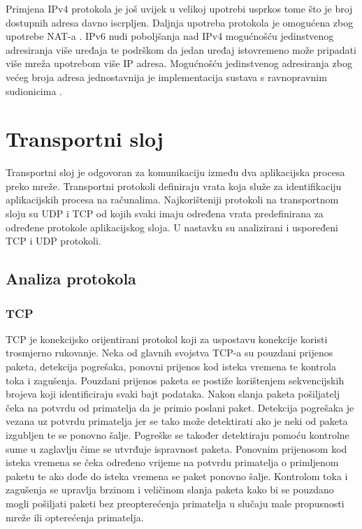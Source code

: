 \documentclass[times, utf8, diplomski]{fer}
\begin{document}
Primjena IPv4 protokola je još uvijek u velikoj upotrebi usprkos tome što je broj dostupnih adresa davno iscrpljen. Daljnja upotreba protokola je omogućena zbog upotrebe NAT-a . IPv6 nudi poboljšanja nad IPv4 mogućnošću jedinstvenog adresiranja više uređaja te podrškom da jedan uređaj istovremeno može pripadati više mreža upotrebom više IP adresa. Mogućnošću jedinstvenog adresiranja zbog većeg broja adresa jednostavnija je implementacija sustava s ravnopravnim sudionicima .

\section{Transportni sloj}
Transportni sloj je odgovoran za komunikaciju između dva aplikacijska procesa preko mreže. Transportni protokoli definiraju vrata  koja služe za identifikaciju aplikacijskih procesa na računalima. Najkorišteniji protokoli na transportnom sloju su UDP  i TCP  od kojih svaki imaju određena vrata predefinirana za određene protokole aplikacijskog sloja. U nastavku su analizirani i uspoređeni TCP i UDP protokoli.

\subsection{Analiza protokola}
\subsubsection{TCP}
TCP je konekcijsko orijentirani protokol koji za uspostavu konekcije koristi trosmjerno rukovanje. Neka od glavnih svojstva TCP-a su pouzdani prijenos paketa, detekcija pogrešaka, ponovni prijenos kod isteka vremena te kontrola toka i zagušenja. Pouzdani prijenos paketa se postiže korištenjem sekvencijskih brojeva koji identificiraju svaki bajt podataka. Nakon slanja paketa pošiljatelj čeka na potvrdu od primatelja da je primio poslani paket. Detekcija pogrešaka je vezana uz potvrdu primatelja jer se tako može detektirati ako je neki od paketa izgubljen te se ponovno šalje. Pogreške se također detektiraju pomoću kontrolne sume u zaglavlju čime se utvrđuje ispravnost paketa. Ponovnim prijenosom kod isteka vremena se čeka određeno vrijeme na potvrdu primatelja o primljenom paketu te ako dođe do isteka vremena se paket ponovno šalje. Kontrolom toka i zagušenja se upravlja brzinom i veličinom slanja paketa kako bi se pouzdano mogli pošiljati paketi bez preopterećenja primatelja u slučaju male propusnosti mreže ili opterećenja primatelja.
\end{document}
